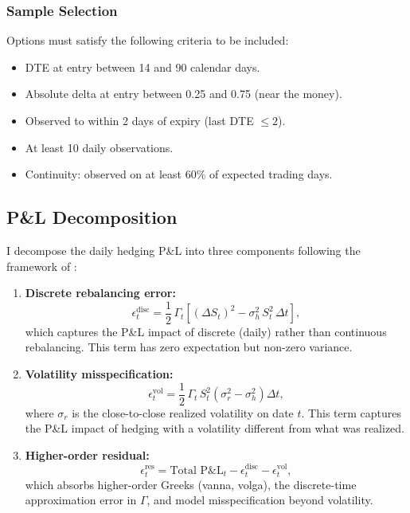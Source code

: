 \documentclass[12pt, letterpaper]{article}
\begin{document}
\subsubsection{Sample Selection}

Options must satisfy the following criteria to be included:

\begin{itemize}
    \item DTE at entry between 14 and 90 calendar days.
    \item Absolute delta at entry between 0.25 and 0.75 (near the money).
    \item Observed to within 2 days of expiry (last DTE $\leq 2$).
    \item At least 10 daily observations.
    \item Continuity: observed on at least 60\% of expected trading days.
\end{itemize}

\subsection{P\&L Decomposition}
\label{sec:pnl_decomp}

I decompose the daily hedging P\&L into three components following the framework of \citet{ElKaroui1998}:

\begin{enumerate}
    \item \textbf{Discrete rebalancing error:}
    \begin{equation}
        \epsilon_t^{\text{disc}} = \frac{1}{2}\,\Gamma_t\left[(\Delta S_t)^2 - \sigma_h^2\, S_t^2\,\Delta t\right],
        \label{eq:discrete_err}
    \end{equation}
    which captures the P\&L impact of discrete (daily) rather than continuous rebalancing. This term has zero expectation but non-zero variance.

    \item \textbf{Volatility misspecification:}
    \begin{equation}
        \epsilon_t^{\text{vol}} = \frac{1}{2}\,\Gamma_t\, S_t^2\left(\sigma_r^2 - \sigma_h^2\right)\Delta t,
        \label{eq:vol_misspec}
    \end{equation}
    where $\sigma_r$ is the close-to-close realized volatility on date $t$. This term captures the P\&L impact of hedging with a volatility different from what was realized.

    \item \textbf{Higher-order residual:}
    \begin{equation}
        \epsilon_t^{\text{res}} = \text{Total P\&L}_t - \epsilon_t^{\text{disc}} - \epsilon_t^{\text{vol}},
        \label{eq:residual}
    \end{equation}
    which absorbs higher-order Greeks (vanna, volga), the discrete-time approximation error in $\Gamma$, and model misspecification beyond volatility.
\end{enumerate}
\end{document}
